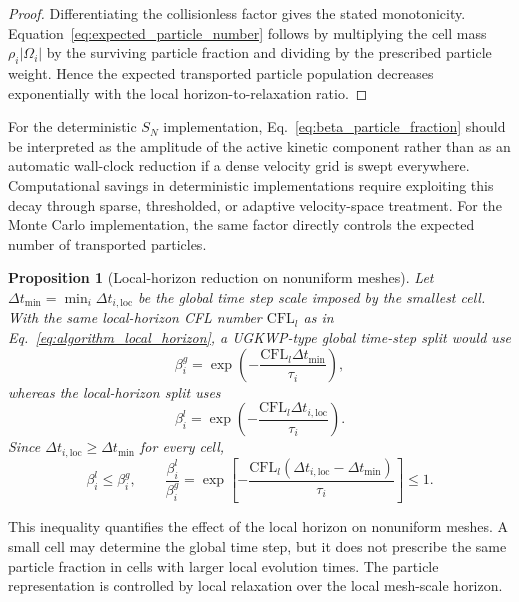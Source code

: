 \documentclass[preprint,12pt]{elsarticle}
\newtheorem{proposition}{Proposition}
\begin{document}
\begin{proof}
Differentiating the collisionless factor gives the stated monotonicity. Equation~\eqref{eq:expected_particle_number} follows by multiplying the cell mass $\rho_i|\Omega_i|$ by the surviving particle fraction and dividing by the prescribed particle weight. Hence the expected transported particle population decreases exponentially with the local horizon-to-relaxation ratio.
\end{proof}

For the deterministic $S_N$ implementation, Eq.~\eqref{eq:beta_particle_fraction} should be interpreted as the amplitude of the active kinetic component rather than as an automatic wall-clock reduction if a dense velocity grid is swept everywhere. Computational savings in deterministic implementations require exploiting this decay through sparse, thresholded, or adaptive velocity-space treatment. For the Monte Carlo implementation, the same factor directly controls the expected number of transported particles.

\begin{proposition}[Local-horizon reduction on nonuniform meshes]\label{prop:local_horizon_reduction}
Let $\Delta t_{\min}=\min_i\Delta t_{i,\mathrm{loc}}$ be the global time step scale imposed by the smallest cell. With the same local-horizon CFL number $\mathrm{CFL}_l$ as in Eq.~\eqref{eq:algorithm_local_horizon}, a UGKWP-type global time-step split would use
\begin{equation}
    \beta_i^{g}=\exp\left(-\frac{\mathrm{CFL}_l\Delta t_{\min}}{\tau_i}\right),
\end{equation}
whereas the local-horizon split uses
\begin{equation}
    \beta_i^{l}=\exp\left(-\frac{\mathrm{CFL}_l\Delta t_{i,\mathrm{loc}}}{\tau_i}\right).
\end{equation}
Since $\Delta t_{i,\mathrm{loc}}\ge\Delta t_{\min}$ for every cell,
\begin{equation}\label{eq:local_vs_global_beta}
    \beta_i^{l}
    \le
    \beta_i^{g},
    \qquad
    \frac{\beta_i^{l}}{\beta_i^{g}}
    =
    \exp\left[
    -\frac{\mathrm{CFL}_l(\Delta t_{i,\mathrm{loc}}-\Delta t_{\min})}{\tau_i}
    \right]
    \le1 .
\end{equation}
\end{proposition}

This inequality quantifies the effect of the local horizon on nonuniform meshes. A small cell may determine the global time step, but it does not prescribe the same particle fraction in cells with larger local evolution times. The particle representation is controlled by local relaxation over the local mesh-scale horizon.
\end{document}
